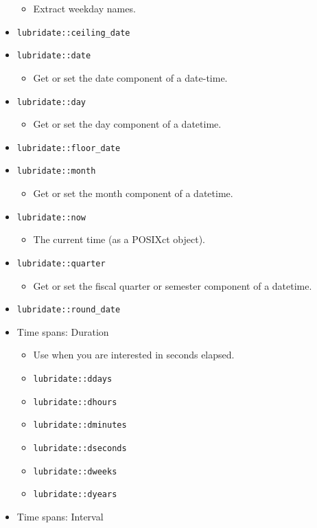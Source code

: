 \documentclass[
]{book}
\providecommand{\tightlist}{%
  \setlength{\itemsep}{0pt}\setlength{\parskip}{0pt}}
\begin{document}
\begin{itemize}
  \begin{itemize}
  \tightlist
  \item
    Extract weekday names.
  \end{itemize}
\item
  \texttt{lubridate::ceiling\_date}
\item
  \texttt{lubridate::date}

  \begin{itemize}
  \tightlist
  \item
    Get or set the date component of a date-time.
  \end{itemize}
\item
  \texttt{lubridate::day}

  \begin{itemize}
  \tightlist
  \item
    Get or set the day component of a datetime.
  \end{itemize}
\item
  \texttt{lubridate::floor\_date}
\item
  \texttt{lubridate::month}

  \begin{itemize}
  \tightlist
  \item
    Get or set the month component of a datetime.
  \end{itemize}
\item
  \texttt{lubridate::now}

  \begin{itemize}
  \tightlist
  \item
    The current time (as a POSIXct object).
  \end{itemize}
\item
  \texttt{lubridate::quarter}

  \begin{itemize}
  \tightlist
  \item
    Get or set the fiscal quarter or semester component of a datetime.
  \end{itemize}
\item
  \texttt{lubridate::round\_date}
\item
  Time spans: Duration

  \begin{itemize}
  \tightlist
  \item
    Use when you are interested in seconds elapsed.
  \item
    \texttt{lubridate::ddays}
  \item
    \texttt{lubridate::dhours}
  \item
    \texttt{lubridate::dminutes}
  \item
    \texttt{lubridate::dseconds}
  \item
    \texttt{lubridate::dweeks}
  \item
    \texttt{lubridate::dyears}
  \end{itemize}
\item
  Time spans: Interval


\end{itemize}
\end{document}

